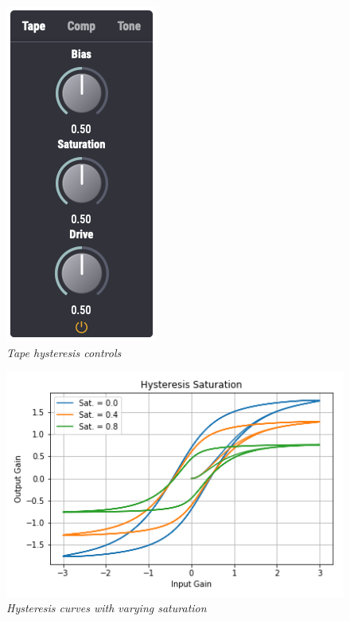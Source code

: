 \documentclass[landscape,twocolumn,a5paper]{manual}
\begin{document}
\begin{figure}[ht]
    \center
    \includegraphics[height=0.4\paperheight]{../Plugin/Screenshots/Tape.png}
    \caption{\label{hysteresis_controls}{\it Tape hysteresis controls}}
\end{figure}
%
%
\begin{figure}[ht]
    \center
    \includegraphics[width=0.85\columnwidth]{../Simulations/Hysteresis/sat.png}
    \caption{\label{h_sat}{\it Hysteresis curves with varying saturation}}
\end{figure}
%
\end{document}
